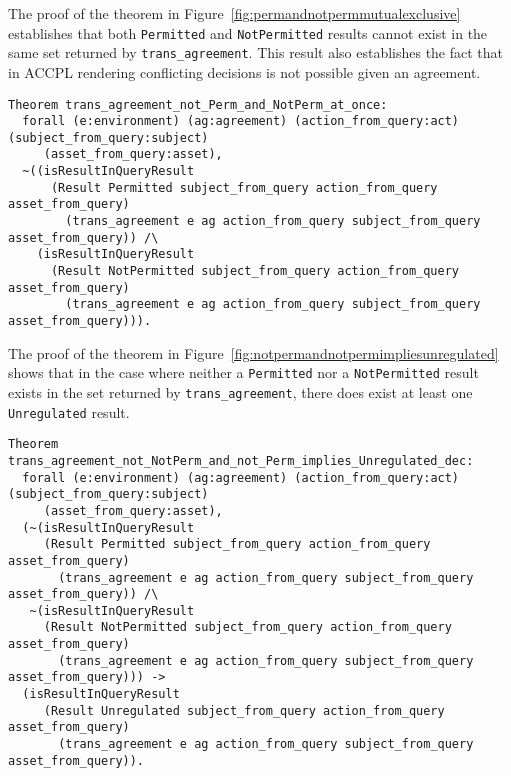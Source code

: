 \documentclass[conference]{IEEEtran}
\newcommand{\syn}{\texttt}
\begin{document}
The proof of the theorem in
Figure~\ref{fig:permandnotpermmutualexclusive} establishes that both
\syn{Permitted} and \syn{NotPermitted} results cannot exist in the
same set returned by \syn{trans_agreement}. This result also
establishes the fact that in \ac{ACCPL} rendering conflicting
decisions is not possible given an agreement.

\lstset{language=Coq, captionpos=b}
\begin{figure*}
\begin{lstlisting}
Theorem trans_agreement_not_Perm_and_NotPerm_at_once:
  forall (e:environment) (ag:agreement) (action_from_query:act) (subject_from_query:subject)
     (asset_from_query:asset),
  ~((isResultInQueryResult 
      (Result Permitted subject_from_query action_from_query asset_from_query)
        (trans_agreement e ag action_from_query subject_from_query asset_from_query)) /\
    (isResultInQueryResult 
      (Result NotPermitted subject_from_query action_from_query asset_from_query)
        (trans_agreement e ag action_from_query subject_from_query asset_from_query))).
\end{lstlisting}
\caption{\syn{Permitted} and \syn{NotPermitted}: Mutually Exclusive}
\label{fig:permandnotpermmutualexclusive}
\end{figure*}

The proof of the theorem in
Figure~\ref{fig:notpermandnotpermimpliesunregulated} shows that in
the case where neither a \syn{Permitted} nor a \syn{NotPermitted}
result exists in the set returned by \syn{trans_agreement}, there does
exist at least one \syn{Unregulated} result.

\lstset{language=Coq, captionpos=b}
\begin{figure*}
\begin{lstlisting}
Theorem trans_agreement_not_NotPerm_and_not_Perm_implies_Unregulated_dec:
  forall (e:environment) (ag:agreement) (action_from_query:act) (subject_from_query:subject)
     (asset_from_query:asset),
  (~(isResultInQueryResult 
     (Result Permitted subject_from_query action_from_query asset_from_query)
       (trans_agreement e ag action_from_query subject_from_query asset_from_query)) /\
   ~(isResultInQueryResult 
     (Result NotPermitted subject_from_query action_from_query asset_from_query)
       (trans_agreement e ag action_from_query subject_from_query asset_from_query))) ->
  (isResultInQueryResult 
     (Result Unregulated subject_from_query action_from_query asset_from_query)
       (trans_agreement e ag action_from_query subject_from_query asset_from_query)).
\end{lstlisting}
\caption{(Not \syn{Permitted} and Not \syn{NotPermitted}) Implies \syn{Unregulated}}
\label{fig:notpermandnotpermimpliesunregulated}
\end{figure*}
\end{document}
